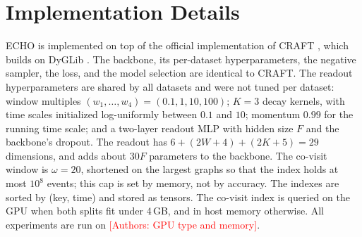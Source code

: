 \documentclass[twoside]{article}
\newcommand{\ours}{ECHO}
\newcommand{\tbd}[1][TBD]{\textcolor{red}{[#1]}}
\begin{document}
\section{Implementation Details}
\label{app:impl}

\ours{} is implemented on top of the official implementation of CRAFT \citep{yi2025craft}, which builds on DyGLib \citep{yu2023dygformer}. The backbone, its per-dataset hyperparameters, the negative sampler, the loss, and the model selection are identical to CRAFT. The readout hyperparameters are shared by all datasets and were not tuned per dataset: window multiples $(w_1,\dots,w_4)=(0.1,1,10,100)$; $K=3$ decay kernels, with time scales initialized log-uniformly between $0.1$ and $10$; momentum $0.99$ for the running time scale; and a two-layer readout MLP with hidden size $F$ and the backbone's dropout. The readout has $6+(2W+4)+(2K+5)=29$ dimensions, and adds about $30F$ parameters to the backbone. The co-visit window is $\omega=20$, shortened on the largest graphs so that the index holds at most $10^8$ events; this cap is set by memory, not by accuracy. The indexes are sorted by (key, time) and stored as tensors. The co-visit index is queried on the GPU when both splits fit under 4\,GB, and in host memory otherwise. All experiments are run on \tbd[Authors: GPU type and memory].
\end{document}
